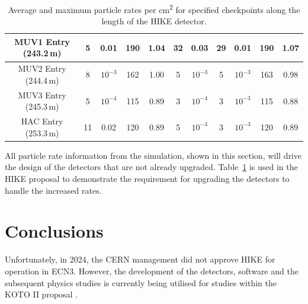 \documentclass[../../main.tex]{subfiles}
\begin{document}
\begin{table}[htbp]
{\begin{tabular}{|c|clllllllll|}
            MUV1 Entry (243.2\,m) & \multicolumn{1}{c|}{5} & \multicolumn{1}{c|}{0.01} & \multicolumn{1}{c|}{190} & \multicolumn{1}{c|}{1.04} & \multicolumn{1}{c|}{32} & \multicolumn{1}{c|}{0.03} & \multicolumn{1}{c|}{29} & \multicolumn{1}{c|}{0.01} & \multicolumn{1}{c|}{190} & \multicolumn{1}{c|}{1.07}\\ \hline
            MUV2 Entry (244.4\,m) & \multicolumn{1}{c|}{8} & \multicolumn{1}{c|}{$10^{-3}$} & \multicolumn{1}{c|}{162} & \multicolumn{1}{c|}{1.00} & \multicolumn{1}{c|}{5} & \multicolumn{1}{c|}{$10^{-3}$} & \multicolumn{1}{c|}{5} & \multicolumn{1}{c|}{$10^{-3}$} & \multicolumn{1}{c|}{163} & \multicolumn{1}{c|}{0.98} \\ \hline
            MUV3 Entry (245.3\,m) & \multicolumn{1}{c|}{5} & \multicolumn{1}{c|}{$10^{-4}$} & \multicolumn{1}{c|}{115} & \multicolumn{1}{c|}{0.89} & \multicolumn{1}{c|}{3} & \multicolumn{1}{c|}{$10^{-4}$} & \multicolumn{1}{c|}{3} & \multicolumn{1}{c|}{$10^{-3}$} & \multicolumn{1}{c|}{115} & \multicolumn{1}{c|}{0.88} \\ \hline
            HAC Entry (253.3\,m) & \multicolumn{1}{c|}{11} & \multicolumn{1}{c|}{0.02} & \multicolumn{1}{c|}{120} & \multicolumn{1}{c|}{0.89} & \multicolumn{1}{c|}{5} & \multicolumn{1}{c|}{$10^{-3}$} & \multicolumn{1}{c|}{3} & \multicolumn{1}{c|}{$10^{-3}$} & \multicolumn{1}{c|}{120} & \multicolumn{1}{c|}{0.89} \\ \hline
            \end{tabular}
        }
        \caption{Average and maximum particle rates per \si{\centi\metre\squared} for specified checkpoints along the length of the HIKE detector.}
        \label{tab:TotalRates}
    \end{table}

    All particle rate information from the simulation, shown in this section, will drive the design of the detectors that are not already upgraded. Table~\ref{tab:TotalRates} is used in the HIKE proposal to demonstrate the requirement for upgrading the detectors to handle the increased rates.

    \section{Conclusions}
    Unfortunately, in 2024, the CERN management did not approve HIKE for operation in ECN3. However, the development of the detectors, software and the subsequent physics studies is currently being utilised for studies within the KOTO II proposal \cite{ahn2025proposalkotoiiexperiment}.

    \ifSubfilesClassLoaded{%
        
    }{} 
\end{document}
